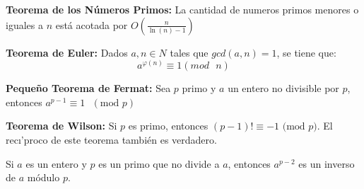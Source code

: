 \begin{itemize}
	\item{\textbf{Teorema de los N\'umeros Primos:}
		La cantidad de numeros primos menores o iguales a $n$ est\'a acotada por $O\left( \frac{n}{\ln(n) - 1} \right)$		
	}
	\item{\textbf{Teorema de Euler:} 
		Dados $a, n \in N$ tales que $gcd(a, n) = 1$, se tiene que:
		$$ a^{ \varphi(n) } \equiv 1 (mod\text{ }n)$$
	\item{
		\textbf{Peque\~no Teorema de Fermat:}
		Sea $p$ primo y $a$ un entero no divisible por $p$, entonces $a^{p-1} \equiv 1 \text{ }(\text{mod } p)$
	}
	\item{
		\textbf{Teorema de Wilson:} Si $p$ es primo, entonces $(p-1)! \equiv -1 \text{ (mod $p$)}$. El rec\i'proco 
		de este teorema tambi\'en es verdadero.
	}
	\item{
		Si $a$ es un entero y $p$ es un primo que no divide a $a$, entonces $a^{p-2}$ es un inverso de $a$ m\'odulo $p$.
	}	
}
\end{itemize}
